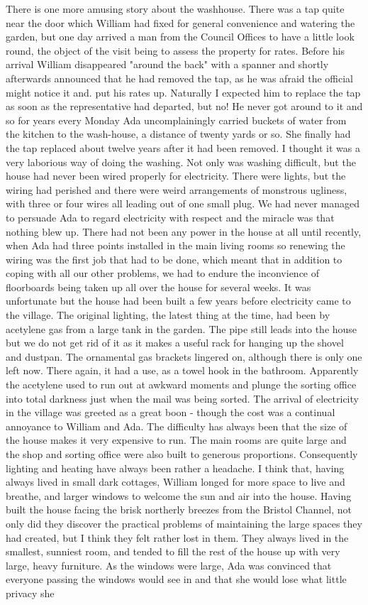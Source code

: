 There is one more amusing story about the washhouse. There was a tap quite near the door which William had fixed for general convenience and watering the garden, but one day arrived a man from the Council Offices to have a little look round, the object of the visit being to assess the property for rates. Before his arrival William disappeared "around the back" with a spanner and shortly afterwards announced that he had removed the tap, as he was afraid the official might notice it and. put his rates up. Naturally I expected him to replace the tap as soon as the representative had departed, but no! He never got around to it and so for years every Monday Ada uncomplainingly carried buckets of water from the kitchen to the wash-house, a distance of twenty yards or so. She finally had the tap replaced about twelve years after it had been removed. I thought it was a very laborious way of doing the washing. Not only was washing difficult, but the house had never been wired properly for electricity. There were lights, but the wiring had perished and there were weird arrangements of monstrous ugliness, with three or four wires all leading out of one small plug. We had never managed to persuade Ada to regard electricity with respect and the miracle was that nothing blew up. There had not been any power in the house at all until recently, when Ada had three points installed in the main living rooms so renewing the wiring was the first job that had to be done, which meant that in addition to coping with all our other problems, we had to endure the inconvience of floorboards being taken up all over the house for several weeks. It was unfortunate but the house had been built a few years before electricity came to the village. The original lighting, the latest thing at the time, had been by acetylene gas from a large tank in the garden. The pipe still leads into the house but we do not get rid of it as it makes a useful rack for hanging up the shovel and dustpan. The ornamental gas brackets lingered on, although there is only one left now. There again, it had a use, as a towel hook in the bathroom. Apparently the acetylene used to run out at awkward moments and plunge the sorting office into total darkness just when the mail was being sorted. The arrival of electricity in the village was greeted as a great boon - though the cost was a continual annoyance to William and Ada. The difficulty has always been that the size of the house makes it very expensive to run. The main rooms are quite large and the shop and sorting office were also built to generous proportions. Consequently lighting and heating have always been rather a headache. I think that, having always lived in small dark cottages, William longed for more space to live and breathe, and larger windows to welcome the sun and air into the house. Having built the house facing the brisk northerly breezes from the Bristol Channel, not only did they discover the practical problems of maintaining the large spaces they had created, but I think they felt rather lost in them. They always lived in the smallest, sunniest room, and tended to fill the rest of the house up with very large, heavy furniture. As the windows were large, Ada was convinced that everyone passing the windows would see in and that she would lose what little privacy she 